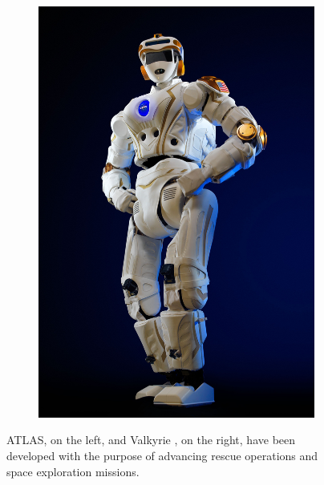 \begin{figure}
\begin{subfigure}[b]{0.4\textwidth}
    \includegraphics[width=\textwidth]{figures/NASA-Valkyrie.jpg}
    \caption{}
    \label{fig:valkyrie}
  \end{subfigure}
  \caption{ATLAS, on the left, and Valkyrie \cite{Radford2015Valkyrie}, on the 
      right, have been developed with the purpose of advancing rescue operations
      and space exploration missions.}
\end{figure}

